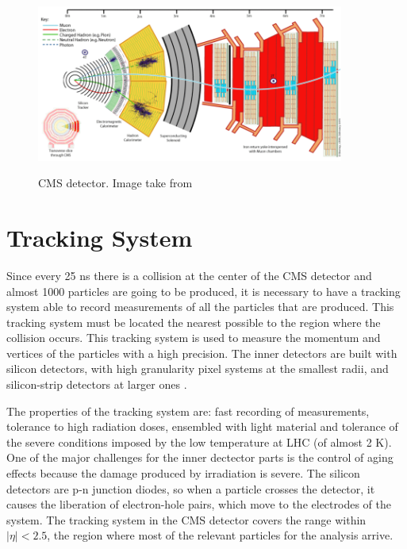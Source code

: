 
 \begin{figure}[h]
 \centering
 \caption{CMS detector. Image take from \cite{CMS_detector_slice}}
 \includegraphics[width=0.9\textwidth]{./Capitulos/CMS/CMS}  
 \label{CMS_detector}
 \end{figure}

\section{Tracking System}

Since every 25 ns there is a collision at the center of the CMS detector and almost 1000 particles are going to be produced, it is necessary to have a tracking system able to record measurements 
of all the particles that are produced. This tracking system must be located the nearest possible to the region where the collision occurs. This tracking system is used to measure the momentum and 
vertices of the particles with a high precision. The inner detectors are built with silicon detectors, with high granularity pixel systems at the smallest radii, and silicon-strip detectors at larger ones \cite{Perspectives_LHC}.

The properties of the tracking system are: fast recording of measurements, tolerance to high radiation doses, ensembled with light material and tolerance of the severe conditions imposed by the low temperature at LHC (of almost 2 K). One of the major challenges for the inner dectector parts is the control of aging effects because the damage produced by irradiation is severe. The silicon detectors are p-n junction diodes, so when a particle crosses the detector, it causes the liberation of electron-hole pairs, which move to the electrodes of the system. The tracking system in the CMS detector covers the range within $|\eta|<2.5$, the region where most of the relevant particles for the analysis arrive. 

